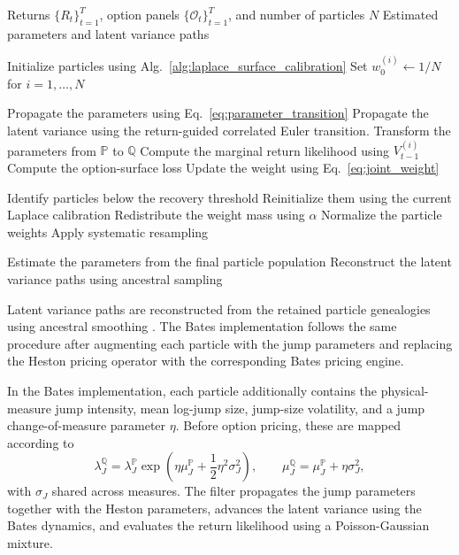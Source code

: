 \documentclass[sigconf,anonymous,review]{acmart}
\begin{document}
\begin{algorithm}[t]
\caption{Online Joint Calibration}
\label{alg:online_joint_calibration}
\begin{algorithmic}[1]
\Require Returns \(\{R_t\}_{t=1}^{T}\), option panels \(\{\mathcal{O}_t\}_{t=1}^{T}\), and number of particles \(N\)
\Ensure Estimated parameters and latent variance paths

\State Initialize particles using Alg.~\ref{alg:laplace_surface_calibration}
\State Set \(w_0^{(i)} \gets 1/N\) for \(i=1,\ldots,N\)

        \State Propagate the parameters using Eq.~\eqref{eq:parameter_transition}
        \State Propagate the latent variance using the return-guided correlated Euler transition.
        \State Transform the parameters from \(\mathbb{P}\) to \(\mathbb{Q}\)
        \State Compute the marginal return likelihood using $V_{t-1}^{(i)}$
        \State Compute the option-surface loss
        \State Update the weight using Eq.~\eqref{eq:joint_weight}
    \EndFor

    \State Identify particles below the recovery threshold
    \State Reinitialize them using the current Laplace calibration
    \State Redistribute the weight mass using \(\alpha\)
    \State Normalize the particle weights
    \State Apply systematic resampling
\EndFor

\State Estimate the parameters from the final particle population
\State Reconstruct the latent variance paths using ancestral sampling
\end{algorithmic}
\end{algorithm}

Latent variance paths are reconstructed from the retained particle genealogies using ancestral smoothing \cite{godsill2004smoothing}. The Bates implementation follows the same procedure after augmenting each particle with the jump parameters and replacing the Heston pricing operator with the corresponding Bates pricing engine.

In the Bates implementation, each particle additionally contains the
physical-measure jump intensity, mean log-jump size, jump-size
volatility, and a jump change-of-measure parameter \(\eta\). Before
option pricing, these are mapped according to
\[
\lambda_J^{\mathbb Q}
=
\lambda_J^{\mathbb P}
\exp\!\left(
\eta\mu_J^{\mathbb P}
+\frac{1}{2}\eta^2\sigma_J^2
\right),
\qquad
\mu_J^{\mathbb Q}
=
\mu_J^{\mathbb P}+\eta\sigma_J^2,
\]
with \(\sigma_J\) shared across measures. The filter propagates the
jump parameters together with the Heston parameters, advances the
latent variance using the Bates dynamics, and evaluates the return
likelihood using a Poisson-Gaussian mixture.
\end{document}
